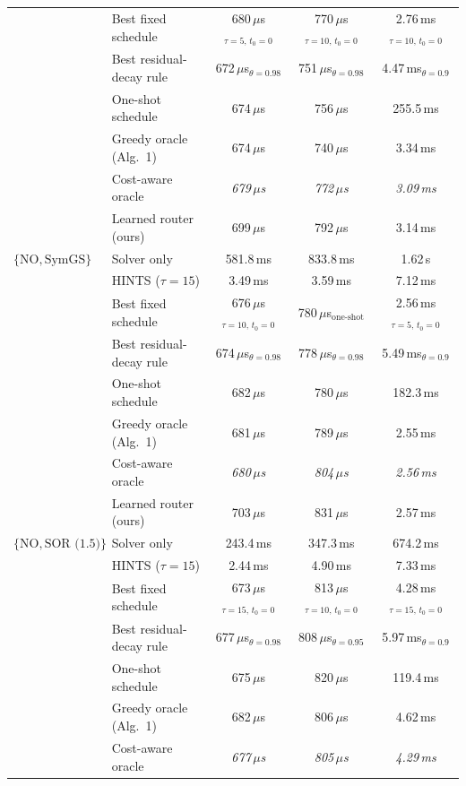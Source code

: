 {\begin{tabular}{llccc}
 & Best fixed schedule & 680\,$\mu$s$_{\tau{=}5,\,t_0{=}0}$ & 770\,$\mu$s$_{\tau{=}10,\,t_0{=}0}$ & 2.76\,ms$_{\tau{=}10,\,t_0{=}0}$ \\
 & Best residual-decay rule & 672\,$\mu$s$_{\theta{=}0.98}$ & 751\,$\mu$s$_{\theta{=}0.98}$ & 4.47\,ms$_{\theta{=}0.9}$ \\
 & One-shot schedule & 674\,$\mu$s & 756\,$\mu$s & 255.5\,ms \\
 & Greedy oracle (Alg.~1) & 674\,$\mu$s & 740\,$\mu$s & 3.34\,ms \\
 & Cost-aware oracle & \textit{679\,$\mu$s} & \textit{772\,$\mu$s} & \textit{3.09\,ms} \\
 & Learned router (ours) & 699\,$\mu$s & 792\,$\mu$s & 3.14\,ms \\
\midrule
$\{\mathrm{NO}, \text{SymGS}\}$ & Solver only & 581.8\,ms & 833.8\,ms & 1.62\,s \\
 & HINTS ($\tau{=}15$) & 3.49\,ms & 3.59\,ms & 7.12\,ms \\
 & Best fixed schedule & 676\,$\mu$s$_{\tau{=}10,\,t_0{=}0}$ & 780\,$\mu$s$_{\text{one-shot}}$ & 2.56\,ms$_{\tau{=}5,\,t_0{=}0}$ \\
 & Best residual-decay rule & 674\,$\mu$s$_{\theta{=}0.98}$ & 778\,$\mu$s$_{\theta{=}0.98}$ & 5.49\,ms$_{\theta{=}0.9}$ \\
 & One-shot schedule & 682\,$\mu$s & 780\,$\mu$s & 182.3\,ms \\
 & Greedy oracle (Alg.~1) & 681\,$\mu$s & 789\,$\mu$s & 2.55\,ms \\
 & Cost-aware oracle & \textit{680\,$\mu$s} & \textit{804\,$\mu$s} & \textit{2.56\,ms} \\
 & Learned router (ours) & 703\,$\mu$s & 831\,$\mu$s & 2.57\,ms \\
\midrule
$\{\mathrm{NO}, \text{SOR (1.5)}\}$ & Solver only & 243.4\,ms & 347.3\,ms & 674.2\,ms \\
 & HINTS ($\tau{=}15$) & 2.44\,ms & 4.90\,ms & 7.33\,ms \\
 & Best fixed schedule & 673\,$\mu$s$_{\tau{=}15,\,t_0{=}0}$ & 813\,$\mu$s$_{\tau{=}10,\,t_0{=}0}$ & 4.28\,ms$_{\tau{=}15,\,t_0{=}0}$ \\
 & Best residual-decay rule & 677\,$\mu$s$_{\theta{=}0.98}$ & 808\,$\mu$s$_{\theta{=}0.95}$ & 5.97\,ms$_{\theta{=}0.9}$ \\
 & One-shot schedule & 675\,$\mu$s & 820\,$\mu$s & 119.4\,ms \\
 & Greedy oracle (Alg.~1) & 682\,$\mu$s & 806\,$\mu$s & 4.62\,ms \\
 & Cost-aware oracle & \textit{677\,$\mu$s} & \textit{805\,$\mu$s} & \textit{4.29\,ms} \\

\end{tabular}}
